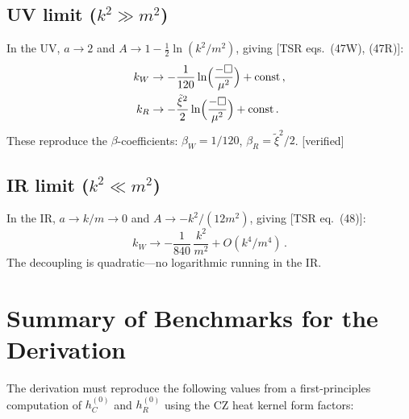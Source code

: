 \documentclass[12pt,a4paper]{article}
\theoremstyle{definition}
\theoremstyle{remark}
\newcommand{\fromlit}[1]{\textcolor{blue!70!black}{\textsf{[#1]}}}
\newcommand{\verified}{\textcolor{green!50!black}{\textsf{[verified]}}}
\begin{document}
\subsection{UV limit ($k^2 \gg m^2$)}

In the UV, $a \to 2$ and $A \to 1 - \frac{1}{2}\ln(k^2/m^2)$,
giving \fromlit{TSR eqs.~(47W), (47R)}:
\begin{align}
  k_W &\to -\frac{1}{120}\ln\Bigl(\frac{-\Box}{\mu^2}\Bigr)
    + \mathrm{const}\,, \\
  k_R &\to -\frac{\tilde{\xi}^2}{2}\ln\Bigl(\frac{-\Box}{\mu^2}\Bigr)
    + \mathrm{const}\,.
\end{align}
These reproduce the $\beta$-coefficients:
$\beta_W = 1/120$, $\beta_R = \tilde{\xi}^2/2$. \verified

\subsection{IR limit ($k^2 \ll m^2$)}

In the IR, $a \to k/m \to 0$ and $A \to -k^2/(12m^2)$, giving
\fromlit{TSR eq.~(48)}:
\begin{equation}
  k_W \to -\frac{1}{840}\,\frac{k^2}{m^2} + O(k^4/m^4)\,.
\end{equation}
The decoupling is quadratic---no logarithmic running in the IR.


\section*{Summary of Benchmarks for the Derivation}

\noindent
The derivation must reproduce the following values from a first-principles
computation of $h_C^{(0)}$ and $h_R^{(0)}$ using the CZ heat kernel
form factors:
\end{document}
